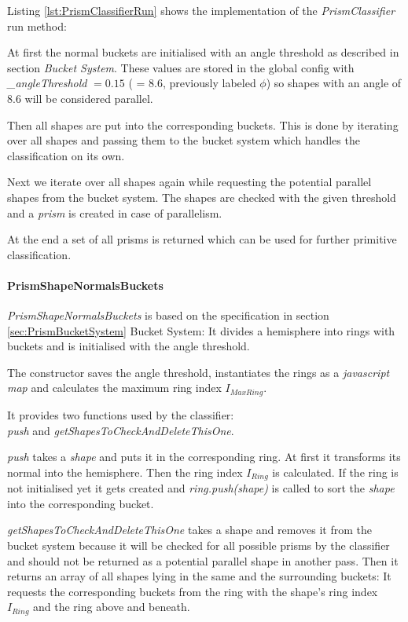 \documentclass[../ClassicThesis.tex]{subfiles}
\begin{document}
Listing \ref{lst:PrismClassifierRun} shows the implementation of the \emph{PrismClassifier} run method: 

At first the normal buckets are initialised with an angle threshold as described in section \emph{Bucket System}. These values are stored in the global config with \emph{\_angleThreshold} $ = 0.15 $  ( = 8.6\textdegree, previously labeled $\phi$) so shapes with an angle  of 8.6\textdegree \hspace{1pt} will be considered parallel. 

Then all shapes are put into the corresponding buckets. This is done by iterating over all shapes and passing them to the bucket system which handles the classification on its own.

Next we iterate over all shapes again while requesting the potential parallel shapes from the bucket system. The shapes are checked with the given threshold and a \emph{prism} is created in case of parallelism.

At the end a set of all prisms is returned which can be used for further primitive classification.


\paragraph{PrismShapeNormalsBuckets}

\emph{PrismShapeNormalsBuckets} is based on the specification in section \ref{sec:PrismBucketSystem} Bucket System: It divides a hemisphere into rings with buckets and is initialised with the angle threshold.

The constructor saves the angle threshold, instantiates the rings as a \emph{javascript map} and calculates the maximum ring index $I_{MaxRing}$.

It provides two functions used by the classifier: \\
\emph{push} and \emph{getShapesToCheckAndDeleteThisOne}.

\emph{push} takes a \emph{shape} and puts it in the corresponding ring. At first it transforms its normal into the hemisphere. Then the ring index $ I_{Ring} $ is calculated. If the ring is not initialised yet it gets created and \emph{ring.push(shape)} is called to sort the \emph{shape} into the corresponding bucket.

\emph{getShapesToCheckAndDeleteThisOne} takes a shape and removes it from the bucket system because it will be checked for all possible prisms by the classifier and should not be returned as a potential parallel shape in another pass. Then it returns an array of all shapes lying in the same and the surrounding buckets: It requests the corresponding buckets from the ring with the shape's ring index $ I_{Ring} $ and the ring above and beneath. 
\end{document}
